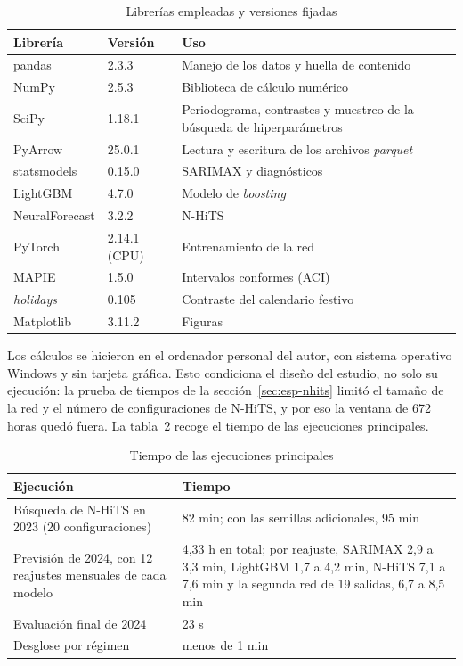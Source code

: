 \begin{table}[htbp]
	\centering
	\caption{Librerías empleadas y versiones fijadas}
	\label{tab:entorno-versiones}
	\small
	\begin{tabular}{llp{6.2cm}}
		\hline
		\textbf{Librería} & \textbf{Versión} & \textbf{Uso} \\
		\hline
		pandas & 2.3.3 & Manejo de los datos y huella de contenido \\
		NumPy & 2.5.3 & Biblioteca de cálculo numérico \\
		SciPy & 1.18.1 & Periodograma, contrastes y muestreo de la búsqueda de hiperparámetros \\
		PyArrow & 25.0.1 & Lectura y escritura de los archivos \textit{parquet} \\
		statsmodels & 0.15.0 & SARIMAX y diagnósticos \\
		LightGBM & 4.7.0 & Modelo de \textit{boosting} \\
		NeuralForecast & 3.2.2 & N-HiTS \\
		PyTorch & 2.14.1 (CPU) & Entrenamiento de la red \\
		MAPIE & 1.5.0 & Intervalos conformes (ACI) \\
		\textit{holidays} & 0.105 & Contraste del calendario festivo \\
		Matplotlib & 3.11.2 & Figuras \\
		\hline
	\end{tabular}
\end{table}

Los cálculos se hicieron en el ordenador personal del autor, con sistema
operativo Windows y sin tarjeta gráfica. Esto condiciona el diseño del
estudio, no solo su ejecución: la prueba de tiempos de la
sección~\ref{sec:esp-nhits} limitó el tamaño de la red y el número de
configuraciones de N-HiTS, y por eso la ventana de 672 horas quedó fuera.
La tabla~\ref{tab:entorno-tiempos} recoge el tiempo de las ejecuciones
principales.

\begin{table}[htbp]
	\centering
	\caption{Tiempo de las ejecuciones principales}
	\label{tab:entorno-tiempos}
	\small
	\begin{tabular}{p{5.6cm}p{8.4cm}}
		\hline
		\textbf{Ejecución} & \textbf{Tiempo} \\
		\hline
		Búsqueda de N-HiTS en 2023 (20 configuraciones) & 82 min; con las semillas adicionales, 95 min \\
		Previsión de 2024, con 12 reajustes mensuales de cada modelo & 4,33 h en total; por reajuste, SARIMAX 2,9 a 3,3 min, LightGBM 1,7 a 4,2 min, N-HiTS 7,1 a 7,6 min y la segunda red de 19 salidas, 6,7 a 8,5 min \\
		Evaluación final de 2024 & 23 s \\
		Desglose por régimen & menos de 1 min \\
		\hline
	\end{tabular}
\end{table}

